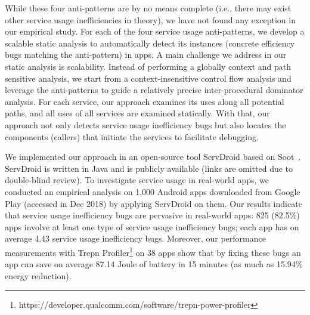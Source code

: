 \documentclass[sigconf,review, anonymous]{acmart}
\begin{document}
While these four anti-patterns are by no means complete (i.e., there may exist
other service usage inefficiencies in theory), we have not found any exception
in our empirical study.
For each of the four service usage anti-patterns, we develop a scalable
static analysis to automatically detect its instances (concrete efficiency
bugs matching the anti-pattern) in apps.
A main challenge we address in our static analysis is scalability.
Instead of performing a globally context and path sensitive analysis, we
start from a context-insensitive control flow analysis and leverage
the anti-patterns to guide a relatively precise inter-procedural dominator
analysis.
For each service, our approach examines its uses along all potential paths, and
all uses of all services are examined statically.
With that, our approach not only detects service usage inefficiency
bugs but also locates the components (callers) that initiate the services to facilitate
debugging.

We implemented our approach in an open-source tool \textsf{ServDroid} based on
Soot~\cite{sootpaper}. \textsf{ServDroid} is written in Java and is publicly
available (links are omitted due to double-blind review).
To investigate service usage in real-world apps, we
conducted an empirical analysis on 1,000 Android apps
downloaded from Google Play (accessed in Dec 2018) by applying \textsf{ServDroid} on them.
Our results indicate that
service usage inefficiency bugs are pervasive in real-world
apps: 825 (82.5\%) apps involve at least one type of service usage inefficiency
bugs; each app has on average 4.43 service usage inefficiency bugs.
Moreover, our performance measurements with \textsf{Trepn
Profiler}\footnote{https://developer.qualcomm.com/software/trepn-power-profiler}
on 38 apps show that by fixing these bugs an app can save on average 87.14
Joule of battery in 15 minutes (as much as 15.94\% energy reduction).

\end{document}
